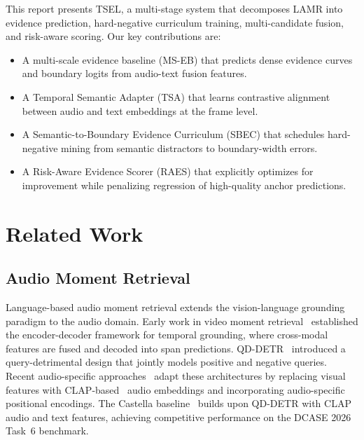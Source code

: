 \documentclass[conference]{IEEEtran}
\begin{document}
This report presents TSEL, a multi-stage system that decomposes LAMR into
evidence prediction, hard-negative curriculum training, multi-candidate fusion,
and risk-aware scoring.  Our key contributions are:
\begin{itemize}
  \item A multi-scale evidence baseline (MS-EB) that predicts dense evidence
        curves and boundary logits from audio-text fusion features.
  \item A Temporal Semantic Adapter (TSA) that learns contrastive alignment
        between audio and text embeddings at the frame level.
  \item A Semantic-to-Boundary Evidence Curriculum (SBEC) that schedules
        hard-negative mining from semantic distractors to boundary-width errors.
  \item A Risk-Aware Evidence Scorer (RAES) that explicitly optimizes for
        improvement while penalizing regression of high-quality anchor
        predictions.
\end{itemize}

\section{Related Work}
\label{sec:related}

\subsection{Audio Moment Retrieval}
Language-based audio moment retrieval extends the vision-language grounding
paradigm to the audio domain.  Early work in video moment
retrieval~\cite{momentdetr,loe} established the encoder-decoder framework for
temporal grounding, where cross-modal features are fused and decoded into span
predictions.  QD-DETR~\cite{qdetr} introduced a query-detrimental design that
jointly models positive and negative queries.  Recent audio-specific
approaches~\cite{castella,tml} adapt these architectures by replacing visual
features with CLAP-based~\cite{clap} audio embeddings and incorporating
audio-specific positional encodings.  The Castella
baseline~\cite{castella} builds upon QD-DETR with CLAP audio and text features,
achieving competitive performance on the DCASE 2026 Task~6 benchmark.
\end{document}
